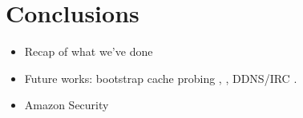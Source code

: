 \chapter{Conclusions}
\begin{itemize}
  \item Recap of what we've done
  \item Future works: bootstrap cache \cite{GnutellaWebCache}
    \cite{P2PVPN}
    probing \cite{BootstrappingP2P}, \cite{BootstrappingP2PLocality},
    \cite{DecentralizedBootstrappingP2P}
    DDNS/IRC \cite{DecentralizedBootstrapping}.
  \item Amazon Security \cite{AmazonS3DevGuide}
\end{itemize}
